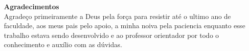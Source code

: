 \thispagestyle{empty}
\begin{center}
\end{center}

\begin{flushright}\footnotesize
\vspace{19cm}

\textbf{Agradecimentos} \\

Agradeço primeiramente a Deus pela força para resistir até o ultimo
ano de faculdade, aos meus pais pelo apoio, a minha noiva pela paciencia
enquanto esse trabalho estava sendo desenvolvido e ao professor
orientador por todo o conhecimento e auxílio com as dúvidas.
\end{flushright}
